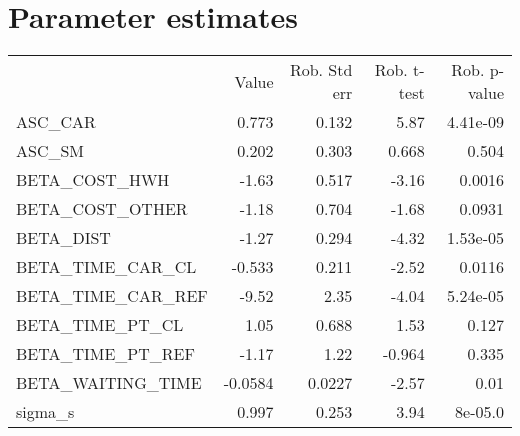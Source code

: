 \section{Parameter estimates}
\begin{tabular}{lrrrr}
 & Value & Rob. Std err & Rob. t-test & Rob. p-value \\
ASC_CAR & 0.773 & 0.132 & 5.87 & 4.41e-09 \\
ASC_SM & 0.202 & 0.303 & 0.668 & 0.504 \\
BETA_COST_HWH & -1.63 & 0.517 & -3.16 & 0.0016 \\
BETA_COST_OTHER & -1.18 & 0.704 & -1.68 & 0.0931 \\
BETA_DIST & -1.27 & 0.294 & -4.32 & 1.53e-05 \\
BETA_TIME_CAR_CL & -0.533 & 0.211 & -2.52 & 0.0116 \\
BETA_TIME_CAR_REF & -9.52 & 2.35 & -4.04 & 5.24e-05 \\
BETA_TIME_PT_CL & 1.05 & 0.688 & 1.53 & 0.127 \\
BETA_TIME_PT_REF & -1.17 & 1.22 & -0.964 & 0.335 \\
BETA_WAITING_TIME & -0.0584 & 0.0227 & -2.57 & 0.01 \\
sigma_s & 0.997 & 0.253 & 3.94 & 8e-05.0 \\
\end{tabular}

